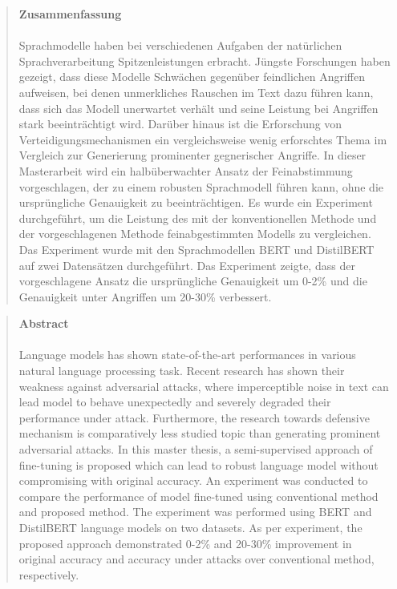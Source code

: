 
\pagestyle{plain}

\begin{quote}
\textbf{\Large Zusammenfassung}\\\\
Sprachmodelle haben bei verschiedenen Aufgaben der natürlichen Sprachverarbeitung Spitzenleistungen erbracht. Jüngste Forschungen haben gezeigt, dass diese Modelle Schwächen gegenüber feindlichen Angriffen aufweisen, bei denen unmerkliches Rauschen im Text dazu führen kann, dass sich das Modell unerwartet verhält und seine Leistung bei Angriffen stark beeinträchtigt wird. Darüber hinaus ist die Erforschung von Verteidigungsmechanismen ein vergleichsweise wenig erforschtes Thema im Vergleich zur Generierung prominenter gegnerischer Angriffe. In dieser Masterarbeit wird ein halbüberwachter Ansatz der Feinabstimmung vorgeschlagen, der zu einem robusten Sprachmodell führen kann, ohne die ursprüngliche Genauigkeit zu beeinträchtigen. Es wurde ein Experiment durchgeführt, um die Leistung des mit der konventionellen Methode und der vorgeschlagenen Methode feinabgestimmten Modells zu vergleichen. Das Experiment wurde mit den Sprachmodellen BERT und DistilBERT auf zwei Datensätzen durchgeführt.  Das Experiment zeigte, dass der vorgeschlagene Ansatz die ursprüngliche Genauigkeit um 0-2\% und die Genauigkeit unter Angriffen um 20-30\% verbessert.
\end{quote}
\newpage

\begin{quote}
	\textbf{\Large Abstract}\\\\
Language models has shown state-of-the-art performances in various natural language  processing task. Recent research has shown their weakness against adversarial attacks, where imperceptible noise in text can lead model to behave unexpectedly and severely degraded their performance under attack. Furthermore, the research towards defensive mechanism is comparatively less studied topic than generating prominent adversarial attacks. In this master thesis, a semi-supervised approach of fine-tuning is proposed which can lead to robust language model without compromising with original accuracy. An experiment was conducted to compare the performance of model fine-tuned using conventional method and proposed method. The experiment was performed using BERT and DistilBERT language models on two datasets.  As per experiment, the proposed approach demonstrated 0-2\% and  20-30\%  improvement in original accuracy and  accuracy under attacks over conventional method, respectively.

\end{quote}
